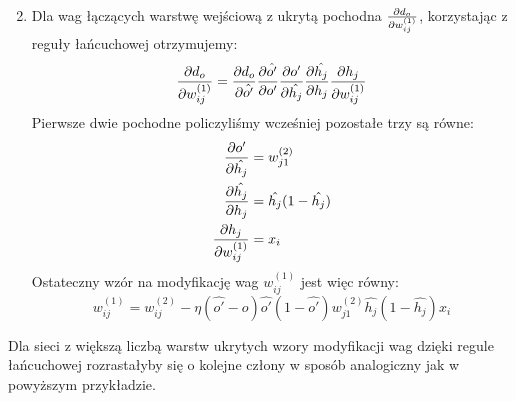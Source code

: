 \documentclass{article}
\begin{document}
\begin{enumerate}
\begin{equation}
\end{equation}
\item Dla wag łączących warstwę wejściową z ukrytą pochodna $\pdv{d_o}{w_{ij}^{(1)}}$,
korzystając z reguły łańcuchowej otrzymujemy:
\begin{equation}
	\pdv{d_o}{w_{ij}^{(1)}} = \pdv{d_o}{\hat{o'}}\pdv{\hat{o'}}{o'}\pdv{o'}{\hat{h_j}}
	                          \pdv{\hat{h_j}}{h_j}\pdv{h_j}{w_{ij}^{(1)}}
\end{equation}
Pierwsze dwie pochodne policzyliśmy wcześniej pozostałe trzy są równe:
\begin{align}
\begin{split}
	\pdv{o'}{\hat{h_j}} &= w_{j1}^{(2)} \\
	\pdv{\hat{h_j}}{h_j} &= \hat{h_j}(1 - \hat{h_j})\\
	\pdv{h_j}{w_{ij}^{(1)}} &= x_i
\end{split}
\end{align}
Ostateczny wzór na modyfikację wag $w_{ij}^{(1)}$ jest więc równy:
\begin{equation}
	w_{ij}^{(1)} = w_{ij}^{(2)} - \eta (\hat{o'} - o)\hat{o'}(1 - \hat{o'})w_{j1}^{(2)}
	                                    \hat{h_j}(1 - \hat{h_j})x_i
\end{equation}
\end{enumerate}
Dla sieci z większą liczbą warstw ukrytych wzory modyfikacji wag dzięki regule łańcuchowej
rozrastałyby się o kolejne człony w sposób analogiczny jak w powyższym przykładzie.
\end{document}
